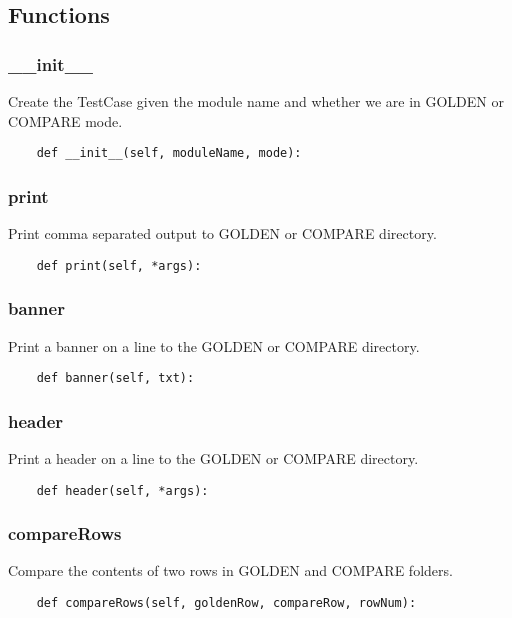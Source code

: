 \documentclass[twoside,11pt]{book}
\begin{document}
\subsection*{Functions}

\subsubsection*{{\bf \_\_init\_\_}}
Create the TestCase given the module name and whether we are in GOLDEN or COMPARE mode.  

\begin{lstlisting}
    def __init__(self, moduleName, mode):
\end{lstlisting}

\subsubsection*{{\bf print}}
Print comma separated output to GOLDEN or COMPARE directory.  

\begin{lstlisting}
    def print(self, *args):
\end{lstlisting}

\subsubsection*{{\bf banner}}
Print a banner on a line to the GOLDEN or COMPARE directory.  

\begin{lstlisting}
    def banner(self, txt):
\end{lstlisting}

\subsubsection*{{\bf header}}
Print a header on a line to the GOLDEN or COMPARE directory.  

\begin{lstlisting}
    def header(self, *args):
\end{lstlisting}

\subsubsection*{{\bf compareRows}}
Compare the contents of two rows in GOLDEN and COMPARE folders. 

\begin{lstlisting}
    def compareRows(self, goldenRow, compareRow, rowNum):
\end{lstlisting}
\end{document}

